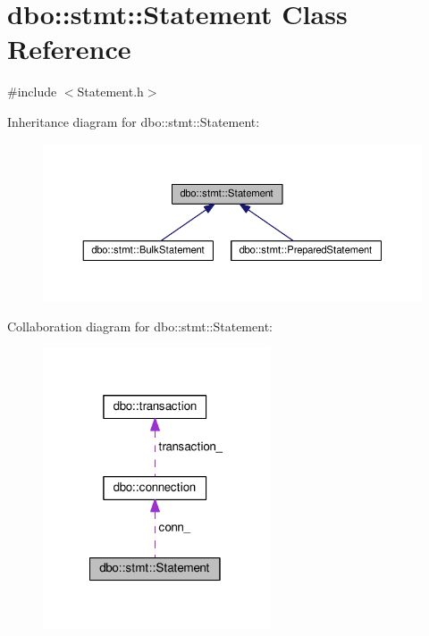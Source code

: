 \hypertarget{classdbo_1_1stmt_1_1_statement}{\section{dbo\+:\+:stmt\+:\+:Statement Class Reference}
\label{classdbo_1_1stmt_1_1_statement}
}


{\ttfamily \#include $<$Statement.\+h$>$}



Inheritance diagram for dbo\+:\+:stmt\+:\+:Statement\+:\nopagebreak
\begin{figure}[H]
\begin{center}
\leavevmode
\includegraphics[width=350pt]{classdbo_1_1stmt_1_1_statement__inherit__graph}
\end{center}
\end{figure}


Collaboration diagram for dbo\+:\+:stmt\+:\+:Statement\+:\nopagebreak
\begin{figure}[H]
\begin{center}
\leavevmode
\includegraphics[width=191pt]{classdbo_1_1stmt_1_1_statement__coll__graph}
\end{center}
\end{figure}
